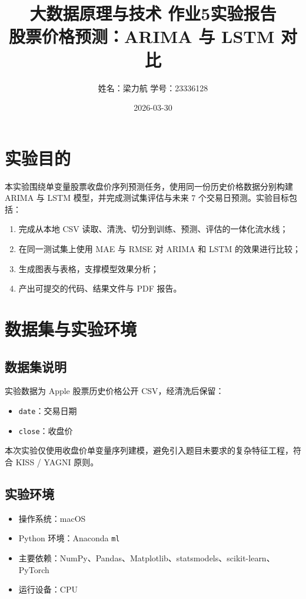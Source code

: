 \documentclass[UTF8,a4paper,12pt]{ctexart}
\title{大数据原理与技术 作业5实验报告\\股票价格预测：ARIMA 与 LSTM 对比}
\author{姓名：梁力航 \quad 学号：23336128}
\date{2026-03-30}
\begin{document}
\maketitle

\section{实验目的}
本实验围绕单变量股票收盘价序列预测任务，使用同一份历史价格数据分别构建 ARIMA 与 LSTM 模型，并完成测试集评估与未来 7 个交易日预测。实验目标包括：
\begin{enumerate}
    \item 完成从本地 CSV 读取、清洗、切分到训练、预测、评估的一体化流水线；
    \item 在同一测试集上使用 MAE 与 RMSE 对 ARIMA 和 LSTM 的效果进行比较；
    \item 生成图表与表格，支撑模型效果分析；
    \item 产出可提交的代码、结果文件与 PDF 报告。
\end{enumerate}

\section{数据集与实验环境}
\subsection{数据集说明}
实验数据为 Apple 股票历史价格公开 CSV，经清洗后保留：
\begin{itemize}
    \item \texttt{date}：交易日期
    \item \texttt{close}：收盘价
\end{itemize}

本次实验仅使用收盘价单变量序列建模，避免引入题目未要求的复杂特征工程，符合 KISS / YAGNI 原则。

\subsection{实验环境}
\begin{itemize}
    \item 操作系统：macOS
    \item Python 环境：Anaconda \texttt{ml}
    \item 主要依赖：NumPy、Pandas、Matplotlib、statsmodels、scikit-learn、PyTorch
    \item 运行设备：CPU
\end{itemize}
\end{document}
